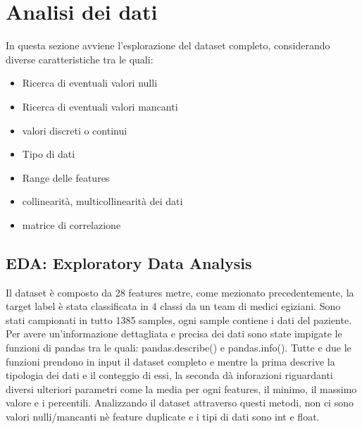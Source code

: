 \section{Analisi dei dati}\label{sec:analisi_dati}\cite{LEZIONI}

In questa sezione avviene l'esplorazione del dataset completo, considerando diverse caratteristiche tra le quali:
\begin{itemize}
\item Ricerca di eventuali valori nulli
\item Ricerca di eventuali valori mancanti
\item valori discreti o continui
\item Tipo di dati
\item Range delle features
\item collinearità, multicollinearità dei dati
\item matrice di correlazione





\end{itemize}
\subsection{EDA: Exploratory Data Analysis}\label{ssec:EDA}

Il dataset è composto da 28 features metre, come mezionato precedentemente, la target label è stata classificata in 4 classi da un team di medici egiziani. Sono stati campionati in tutto 1385 samples, ogni sample contiene i dati del paziente.
Per avere un'informazione dettagliata e precisa dei dati sono state impigate le funzioni di pandas tra le quali: pandas.describe() e pandas.info(). Tutte e due le funzioni prendono in input il dataset completo e mentre la prima descrive la tipologia dei dati e il conteggio di essi, la seconda dà inforazioni riguardanti diversi ulteriori parametri come la media per ogni features, il minimo, il massimo valore e i percentili.  
Analizzando il dataset attraverso questi metodi, non ci sono valori nulli/mancanti nè feature duplicate e i tipi di dati sono int e float. 


